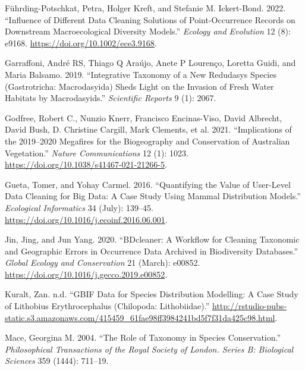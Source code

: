 \documentclass[
  letterpaper,
  DIV=11,
  numbers=noendperiod,
  oneside]{scrreprt}
\newlength{\cslhangindent}
\newlength{\cslentryspacingunit} %
\newenvironment{CSLReferences}[2] %
 {%
  \setlength{\parindent}{0pt}
  \ifodd #1
  \let\oldpar\par
  \def\par{\hangindent=\cslhangindent\oldpar}
  \fi
  \setlength{\parskip}{#2\cslentryspacingunit}
 }%
 {}
\begin{document}
\hypertarget{refs}{}
\begin{CSLReferences}{1}{0}
\leavevmode{}%
Führding-Potschkat, Petra, Holger Kreft, and Stefanie M. Ickert-Bond.
2022. {``Influence of Different Data Cleaning Solutions of
Point-Occurrence Records on Downstream Macroecological Diversity
Models.''} \emph{Ecology and Evolution} 12 (8): e9168.
\url{https://doi.org/10.1002/ece3.9168}.

\leavevmode{}%
Garraffoni, André RS, Thiago Q Araújo, Anete P Lourenço, Loretta Guidi,
and Maria Balsamo. 2019. {``Integrative Taxonomy of a New Redudasys
Species (Gastrotricha: Macrodasyida) Sheds Light on the Invasion of
Fresh Water Habitats by Macrodasyids.''} \emph{Scientific Reports} 9
(1): 2067.

\leavevmode{}%
Godfree, Robert C., Nunzio Knerr, Francisco Encinas-Viso, David
Albrecht, David Bush, D. Christine Cargill, Mark Clements, et al. 2021.
{``Implications of the 2019--2020 Megafires for the Biogeography and
Conservation of {Australian} Vegetation.''} \emph{Nature Communications}
12 (1): 1023. \url{https://doi.org/10.1038/s41467-021-21266-5}.

\leavevmode{}%
Gueta, Tomer, and Yohay Carmel. 2016. {``Quantifying the Value of
User-Level Data Cleaning for Big Data: {A} Case Study Using Mammal
Distribution Models.''} \emph{Ecological Informatics} 34 (July):
139--45. \url{https://doi.org/10.1016/j.ecoinf.2016.06.001}.

\leavevmode{}%
Jin, Jing, and Jun Yang. 2020. {``{BDcleaner}: {A} Workflow for Cleaning
Taxonomic and Geographic Errors in Occurrence Data Archived in
Biodiversity Databases.''} \emph{Global Ecology and Conservation} 21
(March): e00852. \url{https://doi.org/10.1016/j.gecco.2019.e00852}.

\leavevmode{}%
Kuralt, Zan. n.d. {``GBIF Data for Species Distribution Modelling: A
Case Study of Lithobius Erythrocephalus (Chilopoda: Lithobiidae).''}
\url{http://rstudio-pubs-static.s3.amazonaws.com/415459_61fae98ff3984241bd5f7f31da425c98.html}.

\leavevmode{}%
Mace, Georgina M. 2004. {``The Role of Taxonomy in Species
Conservation.''} \emph{Philosophical Transactions of the Royal Society
of London. Series B: Biological Sciences} 359 (1444): 711--19.


\end{CSLReferences}
\end{document}
